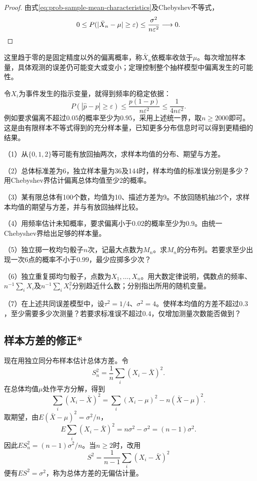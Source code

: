 \begin{proof}
由式\eqref{eq:prob-sample-mean-characteristics}及Chebyshev不等式，
\[
 0\le P(|\bar X_n-\mu|\ge\varepsilon)
 \le\frac{\sigma^2}{n\varepsilon^2}\longrightarrow0.\qedhere
\]
\end{proof}

这里趋于零的是固定精度以外的偏离概率，称\(\bar X_n\){\heiti 依概率收敛}于\(\mu\)。每次增加样本量，具体观测的误差仍可能变大或变小；定理控制整个抽样模型中偏离发生的可能性。

令\(X_i\)为事件发生的指示变量，就得到频率的稳定依据：
\[
 P(|\widehat p-p|\ge\varepsilon)
 \le\frac{p(1-p)}{n\varepsilon^2}
 \le\frac1{4n\varepsilon^2}.
\]
例如要求偏离不超过\(0.05\)的概率至少为\(0.95\)，采用上述统一界，取\(n\ge2000\)即可。这是由有限样本不等式得到的充分样本量，已知更多分布信息时可以得到更精细的结果。

\begin{exercise}
\mbox{}\par\nobreak

（1）从\(\{0,1,2\}\)等可能有放回抽两次，求样本均值的分布、期望与方差。

（2）总体标准差为6，独立样本量为36及144时，样本均值的标准误分别是多少？用Chebyshev界估计偏离总体均值至少2的概率。

（3）某有限总体有100个数，均值为10、描述方差为9。不放回随机抽25个，求样本均值的期望与方差，并与有放回抽样比较。

（4）用频率估计未知概率，要求偏离小于\(0.02\)的概率至少为\(0.9\)。由统一Chebyshev界给出足够的样本量。

（5）独立掷一枚均匀骰子\(n\)次，记最大点数为\(M_n\)。求\(M_n\)的分布列。若要求至少出现一次6点的概率不小于\(0.99\)，最少应掷多少次？

（6）独立重复掷均匀骰子，点数为\(X_1,\ldots,X_n\)。用大数定律说明，偶数点的频率、\(n^{-1}\sum_iX_i\)及\(n^{-1}\sum_iX_i^2\)分别趋近什么数；分别指出所用的随机变量。

（7）在上述共同误差模型中，设\(\tau^2=1/4\)、\(\sigma^2=4\)。使样本均值的方差不超过\(0.3\)，至少需要多少次测量？若要求标准误不超过\(0.4\)，仅增加测量次数能否做到？
\end{exercise}

\FloatBarrier
\newpage
\subsection{样本方差的修正*}

现在用独立同分布样本估计总体方差。令
\[
 S_n^2=\frac1n\sum_i(X_i-\bar X)^2.
\]
在总体均值\(\mu\)处作平方分解，得到
\[
 \sum_i(X_i-\bar X)^2=\sum_i(X_i-\mu)^2-n(\bar X-\mu)^2.
\]
取期望，由\(E(\bar X-\mu)^2=\sigma^2/n\)，
\[
 E\sum_i(X_i-\bar X)^2=n\sigma^2-\sigma^2=(n-1)\sigma^2.
\]
因此\(ES_n^2=(n-1)\sigma^2/n\)。当\(n\ge2\)时，改用
\begin{equation}\label{eq:prob-unbiased-variance}
 S^2=\frac1{n-1}\sum_i(X_i-\bar X)^2
\end{equation}
便有\(ES^2=\sigma^2\)，称为总体方差的{\heiti 无偏估计量}。

